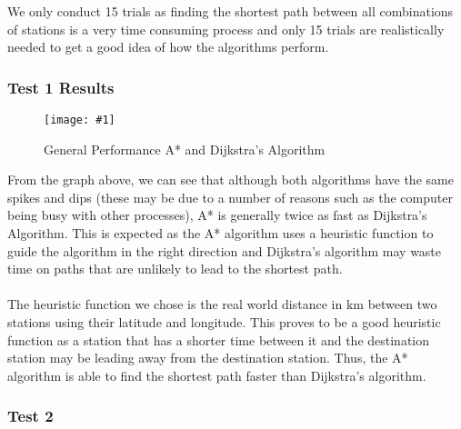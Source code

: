 \documentclass{article}
\newcommand{\figureInsetScaled}[3]
{
    \FloatBarrier{}
    \begin{figure}[ht!]
        \centering
        \texttt{[image: \#1]}
        \caption{#2}
    \end{figure}
    \FloatBarrier{}
}
\begin{document}
We only conduct 15 trials as finding the shortest path between all combinations of stations is a very time consuming process and only 15 trials are realistically needed to get a good idea of how the algorithms perform.\\
\newpage
\subsubsection{Test 1 Results}

\figureInsetScaled{images/part3/General.png}{General Performance A* and Dijkstra’s Algorithm}{1}

From the graph above, we can see that although both algorithms have the same spikes and dips (these may be due to a number of reasons such as the computer being busy with other processes), A* is generally twice as fast as Dijkstra’s Algorithm. This is expected as the A* algorithm uses a heuristic function to guide the algorithm in the right direction and Dijkstra's algorithm may waste time on paths that are unlikely to lead to the shortest path.\\
\\
The heuristic function we chose is the real world distance in km between two stations using their latitude and longitude. This proves to be a good heuristic function as a station that has a shorter time between it and the destination station may be leading away from the destination station. Thus, the A* algorithm is able to find the shortest path faster than Dijkstra’s algorithm.\\

\subsubsection{Test 2}
\end{document}
